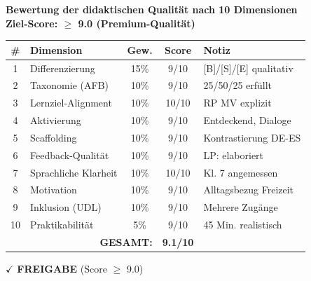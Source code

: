 \documentclass[11pt,a4paper]{article}
\begin{document}
\begin{scorebox}
\textbf{Bewertung der didaktischen Qualität nach 10 Dimensionen}\\
\textbf{Ziel-Score: $\geq$ 9.0 (Premium-Qualität)}

\vspace{1em}
\begin{tabular}{|c|l|c|c|p{4cm}|}
\hline
\textbf{\#} & \textbf{Dimension} & \textbf{Gew.} & \textbf{Score} & \textbf{Notiz} \\
\hline
1 & Differenzierung & 15\% & 9/10 & [B]/[S]/[E] qualitativ \\
\hline
2 & Taxonomie (AFB) & 10\% & 9/10 & 25/50/25 erfüllt \\
\hline
3 & Lernziel-Alignment & 10\% & 10/10 & RP MV explizit \\
\hline
4 & Aktivierung & 10\% & 9/10 & Entdeckend, Dialoge \\
\hline
5 & Scaffolding & 10\% & 9/10 & Kontrastierung DE-ES \\
\hline
6 & Feedback-Qualität & 10\% & 9/10 & LP: elaboriert \\
\hline
7 & Sprachliche Klarheit & 10\% & 10/10 & Kl. 7 angemessen \\
\hline
8 & Motivation & 10\% & 9/10 & Alltagsbezug Freizeit \\
\hline
9 & Inklusion (UDL) & 10\% & 9/10 & Mehrere Zugänge \\
\hline
10 & Praktikabilität & 5\% & 9/10 & 45 Min. realistisch \\
\hline
\multicolumn{3}{|r|}{\textbf{GESAMT:}} & \textbf{9.1/10} & \\
\hline
\end{tabular}

\vspace{1em}
$\checkmark$ \textcolor{successgreen}{\textbf{FREIGABE} (Score $\geq$ 9.0)}
\end{scorebox}
\end{document}
